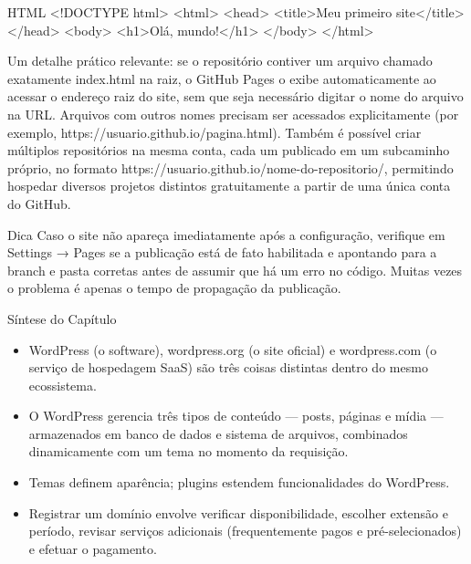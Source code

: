 \begin{codebox}{HTML}
   <!DOCTYPE html>
   <html>
   <head>
     <title>Meu primeiro site</title>
   </head>
   <body>
     <h1>Olá, mundo!</h1>
   </body>
   </html>
\end{codebox}

Um detalhe prático relevante: se o repositório contiver um arquivo chamado exatamente index.html na raiz, o GitHub Pages o exibe automaticamente ao acessar o endereço raiz do site, sem que seja necessário digitar o nome do arquivo na URL. Arquivos com outros nomes precisam ser acessados explicitamente (por exemplo, https://usuario.github.io/pagina.html). Também é possível criar múltiplos repositórios na mesma conta, cada um publicado em um subcaminho próprio, no formato https://usuario.github.io/nome-do-repositorio/, permitindo hospedar diversos projetos distintos gratuitamente a partir de uma única conta do GitHub.

\begin{infobox}{Dica}
Caso o site não apareça imediatamente após a configuração, verifique em Settings → Pages se a publicação está de fato habilitada e apontando para a branch e pasta corretas antes de assumir que há um erro no código. Muitas vezes o problema é apenas o tempo de propagação da publicação.
\end{infobox}

Síntese do Capítulo

\begin{itemize}
  \item WordPress (o software), wordpress.org (o site oficial) e wordpress.com (o serviço de hospedagem SaaS) são três coisas distintas dentro do mesmo ecossistema.
\end{itemize}

\begin{itemize}
  \item O WordPress gerencia três tipos de conteúdo — posts, páginas e mídia — armazenados em banco de dados e sistema de arquivos, combinados dinamicamente com um tema no momento da requisição.
\end{itemize}

\begin{itemize}
  \item Temas definem aparência; plugins estendem funcionalidades do WordPress.
\end{itemize}

\begin{itemize}
  \item Registrar um domínio envolve verificar disponibilidade, escolher extensão e período, revisar serviços adicionais (frequentemente pagos e pré-selecionados) e efetuar o pagamento.
\end{itemize}

